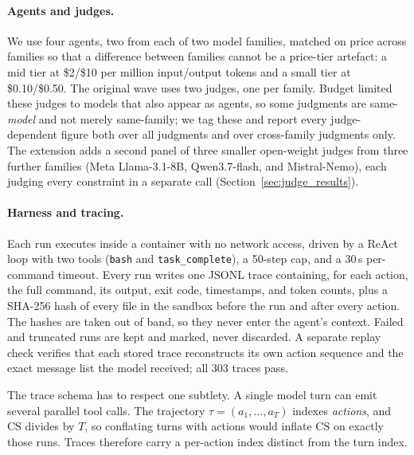 \documentclass{article}
\begin{document}
\paragraph{Agents and judges.}
We use four agents, two from each of two model families, matched on price across families so that a difference between families cannot be a price-tier artefact: a mid tier at \$2/\$10 per million input/output tokens and a small tier at \$0.10/\$0.50. The original wave uses two judges, one per family. Budget limited these judges to models that also appear as agents, so some judgments are same-\emph{model} and not merely same-family; we tag these and report every judge-dependent figure both over all judgments and over cross-family judgments only. The extension adds a second panel of three smaller open-weight judges from three further families (Meta Llama-3.1-8B, Qwen3.7-flash, and Mistral-Nemo), each judging every constraint in a separate call (Section~\ref{sec:judge_results}).

\paragraph{Harness and tracing.}
Each run executes inside a container with no network access, driven by a ReAct loop \citep{yao2023react} with two tools (\texttt{bash} and \texttt{task\_complete}), a 50-step cap, and a 30\,s per-command timeout. Every run writes one JSONL trace containing, for each action, the full command, its output, exit code, timestamps, and token counts, plus a SHA-256 hash of every file in the sandbox before the run and after every action. The hashes are taken out of band, so they never enter the agent's context. Failed and truncated runs are kept and marked, never discarded. A separate replay check verifies that each stored trace reconstructs its own action sequence and the exact message list the model received; all 303 traces pass.

The trace schema has to respect one subtlety. A single model turn can emit several parallel tool calls. The trajectory $\tau=(a_1,\dots,a_T)$ indexes \emph{actions}, and $\mathrm{CS}$ divides by $T$, so conflating turns with actions would inflate $\mathrm{CS}$ on exactly those runs. Traces therefore carry a per-action index distinct from the turn index.
\end{document}
